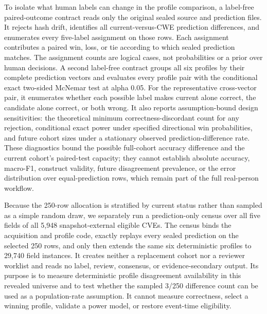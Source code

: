 To isolate what human labels can change in the profile comparison, a label-free paired-outcome contract reads only the original sealed source and prediction files. It rejects hash drift, identifies all current-versus-CWE prediction differences, and enumerates every five-label assignment on those rows. Each assignment contributes a paired win, loss, or tie according to which sealed prediction matches. The assignment counts are logical cases, not probabilities or a prior over human decisions. A second label-free contract groups all six profiles by their complete prediction vectors and evaluates every profile pair with the conditional exact two-sided McNemar test at alpha 0.05. For the representative cross-vector pair, it enumerates whether each possible label makes current alone correct, the candidate alone correct, or both wrong. It also reports assumption-bound design sensitivities: the theoretical minimum correctness-discordant count for any rejection, conditional exact power under specified directional win probabilities, and future cohort sizes under a stationary observed prediction-difference rate. These diagnostics bound the possible full-cohort accuracy difference and the current cohort's paired-test capacity; they cannot establish absolute accuracy, macro-F1, construct validity, future disagreement prevalence, or the error distribution over equal-prediction rows, which remain part of the full real-person workflow.

Because the 250-row allocation is stratified by current status rather than sampled as a simple random draw, we separately run a prediction-only census over all five fields of all 5,948 snapshot-external eligible CVEs. The census binds the acquisition and profile code, exactly replays every sealed prediction on the selected 250 rows, and only then extends the same six deterministic profiles to 29,740 field instances. It creates neither a replacement cohort nor a reviewer worklist and reads no label, review, consensus, or evidence-secondary output. Its purpose is to measure deterministic profile disagreement availability in this revealed universe and to test whether the sampled 3/250 difference count can be used as a population-rate assumption. It cannot measure correctness, select a winning profile, validate a power model, or restore event-time eligibility.

